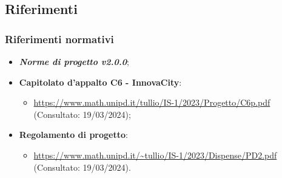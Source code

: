 \subsection{Riferimenti}

\subsubsection{Riferimenti normativi}
\begin{itemize}
    \item \textbf{\textit{Norme di progetto v2.0.0}};
    \item \textbf{Capitolato d'appalto C6 - InnovaCity}:
    \begin{itemize}
        \item \url{https://www.math.unipd.it/tullio/IS-1/2023/Progetto/C6p.pdf} (Consultato: 19/03/2024);
    \end{itemize}
    \item \textbf{Regolamento di progetto}:
    \begin{itemize}
        \item \url{https://www.math.unipd.it/~tullio/IS-1/2023/Dispense/PD2.pdf} (Consultato: 19/03/2024).
    \end{itemize}
\end{itemize}

